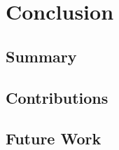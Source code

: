 \chapter{Conclusion}
\label{chap:conclusion}


\section{Summary}

\section{Contributions}

\section{Future Work}


